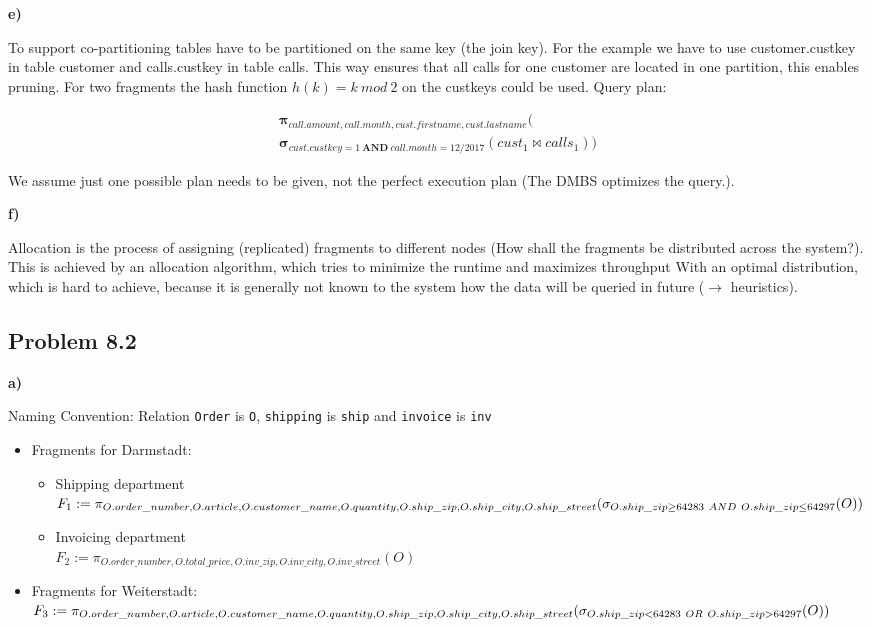 \documentclass{scrartcl}
\begin{document}
\textbf{e)} 

To support co-partitioning tables have to be partitioned on the same key (the join key).
 For the example we have to use customer.custkey in table customer and calls.custkey in table calls. 
 This way ensures that all calls for one customer are located in one partition, this enables pruning.
For two fragments the hash function $h(k) = k\ mod\ 2$ on the custkeys could be used.
Query plan:

\begin{align*}
	\boldsymbol{\pi}_{call.amount,call.month,cust.firstname,cust.lastname}( \\
	\boldsymbol{\sigma}_{cust.custkey=1\ \boldsymbol{AND}\ call.month=12/2017}(cust_{1} \boldsymbol{\bowtie} calls_{1}))
\end{align*}

We assume just one possible plan needs to be given, not the perfect execution plan (The DMBS optimizes the query.).

\textbf{f)} 

Allocation is the process of assigning (replicated) fragments to different nodes (How shall the fragments be distributed across the system?). This is achieved by an allocation algorithm, which tries to minimize the runtime and maximizes throughput
With an optimal distribution, which is hard to achieve, because it is generally not known to the system how the data will be queried in future ($\longrightarrow$ heuristics). 

\subsection*{Problem 8.2}

\textbf{a)} 

Naming Convention: Relation \texttt{Order} is \texttt{O}, \texttt{shipping} is \texttt{ship} and \texttt{invoice} is \texttt{inv} \\

\begin{itemize}
	\item Fragments for Darmstadt: \\
	\begin{itemize}
		\item Shipping department \\
			$F_1 := \pi_{O.order\_number,O.article,O.customer\_name,O.quantity,O.ship\_zip,O.ship\_city,O.ship\_street}\\
			(\sigma_{O.ship\_zip \ge 64283\ AND\ O.ship\_zip \le 64297}(O))$ \\
		\item Invoicing department \\
			$F_2 := \pi_{O.order\_number,O.total\_price,O.inv\_zip,O.inv\_city,O.inv\_street}(O)$ \\
	\end{itemize}
	\item Fragments for Weiterstadt: \\
		$F_3 := \pi_{O.order\_number,O.article,O.customer\_name,O.quantity,O.ship\_zip,O.ship\_city,O.ship\_street}( \\								\sigma_{O.ship\_zip < 64283\ OR\ O.ship\_zip > 64297}(O))$
\end{itemize}
\end{document}
